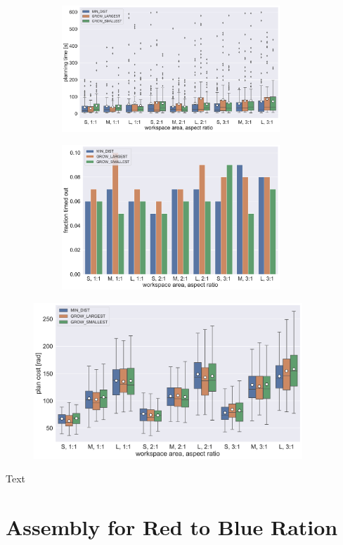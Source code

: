 \begin{figure}
	\centering
	\begin{subfigure}[b]{\textwidth}
		\centering
		\includegraphics[width=0.9\textwidth]{figures/plots/AFBS_time.pdf}
		\caption{}
		\label{fig:AFBS_time}
	\end{subfigure}
	
	\begin{subfigure}[b]{\textwidth}
		\centering
		\includegraphics[width=0.9\textwidth]{figures/plots/AFBS_timeout.pdf}
		\caption{}
		\label{fig:AFBS_timeout}
	\end{subfigure}
	\caption[]{}
	\label{fig:AFBS_timestats}
\end{figure}

\begin{figure}
	\centering
	\includegraphics[width=0.9\textwidth]{figures/plots/AFBS_cost.pdf}
	\caption[]{}
	\label{fig:AFBS_cost}
\end{figure}

Text


\section{Assembly for Red to Blue Ration}
\label{sec:AFNR}



